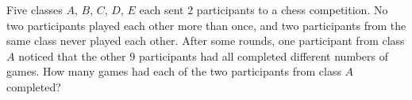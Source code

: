 Five classes $A$, $B$, $C$, $D$, $E$ each sent $2$ participants to a chess competition. No two participants played each other more than once, and two participants from the same class never played each other. After some rounds, one participant from class $A$ noticed that the other $9$ participants had all completed different numbers of games. How many games had each of the two participants from class $A$ completed?
